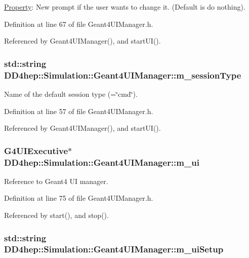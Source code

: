 \hyperlink{class_d_d4hep_1_1_property}{Property}: New prompt if the user wants to change it. (Default is do nothing). 

Definition at line 67 of file Geant4UIManager.h.

Referenced by Geant4UIManager(), and startUI().\hypertarget{class_d_d4hep_1_1_simulation_1_1_geant4_u_i_manager_aeef8066abb2d31001194f741f423a8b3}{
\subsubsection[{m\_\-sessionType}]{\setlength{\rightskip}{0pt plus 5cm}std::string {\bf DD4hep::Simulation::Geant4UIManager::m\_\-sessionType}}}
\label{class_d_d4hep_1_1_simulation_1_1_geant4_u_i_manager_aeef8066abb2d31001194f741f423a8b3}


Name of the default session type (=\char`\"{}cmd\char`\"{}). 

Definition at line 57 of file Geant4UIManager.h.

Referenced by Geant4UIManager(), and startUI().\hypertarget{class_d_d4hep_1_1_simulation_1_1_geant4_u_i_manager_aeec06cd94ff75bad4130a535145be277}{
\subsubsection[{m\_\-ui}]{\setlength{\rightskip}{0pt plus 5cm}G4UIExecutive$\ast$ {\bf DD4hep::Simulation::Geant4UIManager::m\_\-ui}}}
\label{class_d_d4hep_1_1_simulation_1_1_geant4_u_i_manager_aeec06cd94ff75bad4130a535145be277}


Reference to Geant4 UI manager. 

Definition at line 75 of file Geant4UIManager.h.

Referenced by start(), and stop().\hypertarget{class_d_d4hep_1_1_simulation_1_1_geant4_u_i_manager_a9c86ca8f03b026e13ae71de58164b339}{
\subsubsection[{m\_\-uiSetup}]{\setlength{\rightskip}{0pt plus 5cm}std::string {\bf DD4hep::Simulation::Geant4UIManager::m\_\-uiSetup}}}
\label{class_d_d4hep_1_1_simulation_1_1_geant4_u_i_manager_a9c86ca8f03b026e13ae71de58164b339}



